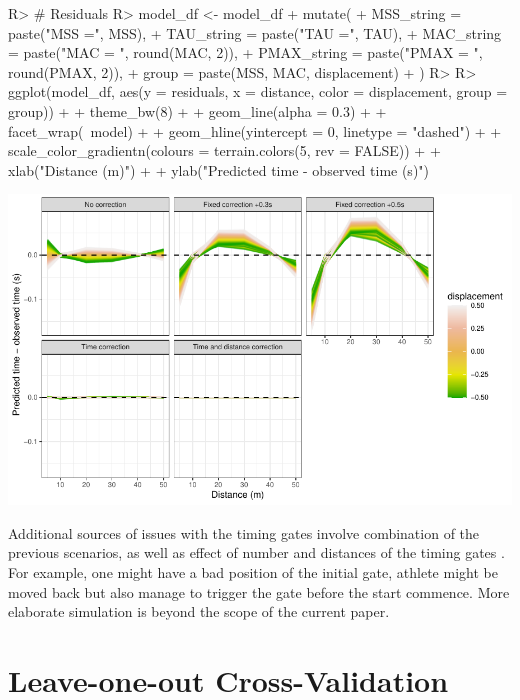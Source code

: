 \documentclass[
]{jss}
\begin{document}
\begin{CodeChunk}
\begin{CodeInput}
R> # Residuals
R> model_df <- model_df %
+   mutate(
+     MSS_string = paste("MSS =", MSS),
+     TAU_string = paste("TAU =", TAU),
+     MAC_string = paste("MAC = ", round(MAC, 2)),
+     PMAX_string = paste("PMAX = ", round(PMAX, 2)),
+     group = paste(MSS, MAC, displacement)
+   )
R> 
R> ggplot(model_df, aes(y = residuals, x = distance, color = displacement, group = group)) +
+   theme_bw(8) +
+   geom_line(alpha = 0.3) +
+   facet_wrap(~model) +
+   geom_hline(yintercept = 0, linetype = "dashed") +
+   scale_color_gradientn(colours = terrain.colors(5, rev = FALSE)) +
+   xlab("Distance (m)") +
+   ylab("Predicted time - observed time (s)")
\end{CodeInput}


\begin{center}\includegraphics[width=1\linewidth]{paper_files/figure-latex/unnamed-chunk-54-1} \end{center}

\end{CodeChunk}

Additional sources of issues with the timing gates involve combination of the previous scenarios, as well as effect of number and distances of the timing gates \citetext{\citealp{haugenPowerForceVelocityProfilingSprinting2020}; \citealp[also see][]{haugenDifferenceStartImpact2012}}. For example, one might have a bad position of the initial gate, athlete might be moved back but also manage to trigger the gate before the start commence. More elaborate simulation is beyond the scope of the current paper.

\hypertarget{leave-one-out-cross-validation}{%
\section{Leave-one-out Cross-Validation}\label{leave-one-out-cross-validation}}
\end{document}
